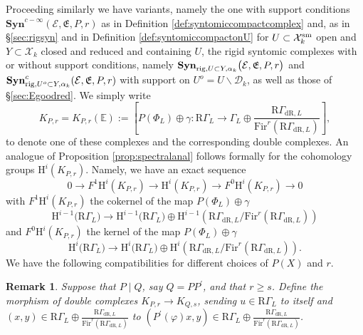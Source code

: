 \documentclass[asterisque,english]{smfart}
\newtheorem{remark}[theo]{Remark}
\begin{document}
Proceeding similarly we have variants, namely the one with support conditions  $\mathbf{Syn}^{c-\infty}(\mathcal{E},\mathfrak{E},P,r)$ as in Definition \ref{def:syntomiccompactcomplex} and, as in \S  \ref{sec:rigsyn} and in Definition \ref{def:syntomiccompactonU}  for $U\subset \mathcal{X}_k^{\rm sm}$ open and $Y\subset \mathcal{X}_k$ closed and reduced and containing $U$, the rigid syntomic complexes with or without support conditions, namely $\mathbf{Syn}_{{\rm rig},U\subset Y, \alpha_k}\bigl(\mathcal{E},\mathfrak{E},P,r\bigr)$  and $\mathbf{Syn}_{{\rm rig},U^o\subset Y, \alpha_k}^c(\mathcal{E},\mathfrak{E},P,r)$  with support on $U^o=U\backslash \mathcal{D}_k$, as well as those of \S \ref{sec:Egoodred}. We simply write 
$$ 
K_{P,r}=K_{P,r}\left( \mathbb{E}\right) :=\left[ P\left( \Phi
_{L}\right) \oplus \gamma \colon \mathrm{R}\Gamma _{L}\longrightarrow \Gamma
_{L}\oplus \frac{\mathrm{R}\Gamma _{\mathrm{dR},L}}{\mathrm{Fir}^{r}\left(
\mathrm{R}\Gamma _{\mathrm{dR},L}\right) }\right],
$$
to denote one of these complexes and the corresponding double complexes.  An analogue of Proposition \ref{prop:spectralanal} follows formally for the cohomology groups $\mathrm{H}^i(K_{P,r})$. Namely, we have an exact sequence $$0\longrightarrow F^1 \mathrm{H}^i(K_{P,r}) \longrightarrow  \mathrm{H}^i(K_{P,r}) \longrightarrow F^0\mathrm{H}^i(K_{P,r}) \longrightarrow 0$$with $ F^1 \mathrm{H}^i(K_{P,r})$ the cokernel of the map $P\left( \Phi
_{L}\right) \oplus \gamma$  
$$\mathrm{H}^{i-1}\bigl(\mathrm{R}\Gamma _{L}\bigr)\longrightarrow \mathrm{H}^{i-1}\bigl(\mathrm{R}\Gamma _{L}\bigr) \oplus \mathrm{H}^{i-1}\left(\mathrm{R}\Gamma _{\mathrm{dR},L}/\mathrm{Fir}^{r}\left(
\mathrm{R}\Gamma _{\mathrm{dR},L}\right)\right)$$and  $ F^0 \mathrm{H}^i(K_{P,r})$ the kernel of the map $P\left( \Phi
_{L}\right) \oplus \gamma$  $$\mathrm{H}^i\bigl(\mathrm{R}\Gamma _{L}\bigr)\longrightarrow \mathrm{H}^i\bigl(\mathrm{R}\Gamma _{L}\bigr) \oplus \mathrm{H}^i\left(\mathrm{R}\Gamma _{\mathrm{dR},L}/\mathrm{Fir}^{r}\left(
\mathrm{R}\Gamma _{\mathrm{dR},L}\right)\right).$$We have the following compatibilities for different choices of $P(X)$ and $r$.

\begin{remark}
\label{rmk:Poly R2} Suppose that $P\mid Q$, say $Q=PP^{\prime }$, and that $r\geq
s$. Define the morphism of double complexes $K_{P,r}\longrightarrow K_{Q,s}$, sending $u\in \mathrm{R}\Gamma _{L}$ to itself and $\left( x,y\right) \in \mathrm{R} \Gamma
_{L}\oplus \frac{\mathrm{R}\Gamma _{\mathrm{dR},L}}{\mathrm{Fir}^{r}\left(
\mathrm{R}\Gamma _{\mathrm{dR},L}\right) } $ to $\left( P^{\prime }\left(
\varphi \right) x,y\right) \in \mathrm{R} \Gamma
_{L}\oplus \frac{\mathrm{R}\Gamma _{\mathrm{dR},L}}{\mathrm{Fir}^{r}\left(
\mathrm{R}\Gamma _{\mathrm{dR},L}\right) }$. 
\end{remark}
\end{document}
